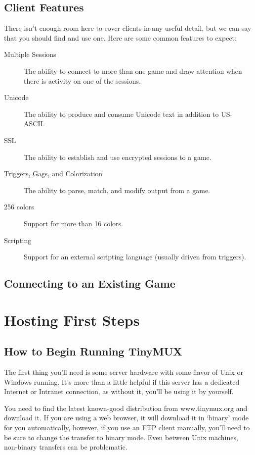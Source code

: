 \documentclass[10pt,letterpaper]{book}
\begin{document}
\section{Client Features}
There isn't enough room here to cover clients in any useful detail, but we can
say that you should find and use one.
Here are some common features to expect:
\begin{description}
\item[Multiple Sessions]
The ability to connect to more than one game and draw attention when there is activity on one of the sessions.

\item[Unicode]
The ability to produce and consume Unicode text in addition to US-ASCII.

\item[SSL]
The ability to establish and use encrypted sessions to a game.

\item[Triggers, Gags, and Colorization]
The ability to parse, match, and modify output from a game.

\item[256 colors]
Support for more than 16 colors.

\item[Scripting]
Support for an external scripting language (usually driven from triggers).

\end{description}

\section{Connecting to an Existing Game}

\chapter{Hosting First Steps}
\section{How to Begin Running TinyMUX}
The first thing you'll need is some server hardware with some flavor of Unix or
Windows running. It's more than a little helpful if this server has a dedicated
Internet or Intranet connection, as without it, you'll be using it by yourself.

You need to find the latest known-good distribution from
www.tinymux.org and download it. If you are using a web browser, it will
download it in `binary' mode for you automatically, however, if you use an FTP
client manually, you'll need to be sure to change the transfer to binary mode.
Even between Unix machines, non-binary transfers can be problematic.
\end{document}
